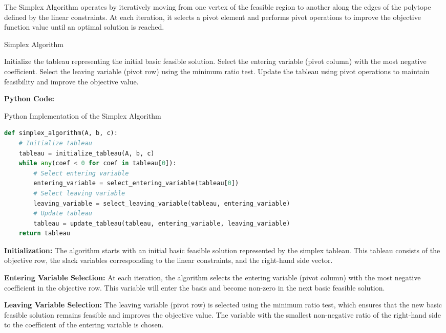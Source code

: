 \documentclass[12pt]{book} %
\begin{document}
The Simplex Algorithm operates by iteratively moving from one vertex of the feasible region to another along the edges of the polytope defined by the linear constraints. At each iteration, it selects a pivot element and performs pivot operations to improve the objective function value until an optimal solution is reached.
\FloatBarrier
\begin{algorithm}[H]
\caption{Simplex Algorithm}
\begin{algorithmic}[1]
\State Initialize the tableau representing the initial basic feasible solution.
    \State Select the entering variable (pivot column) with the most negative coefficient.
    \State Select the leaving variable (pivot row) using the minimum ratio test.
    \State Update the tableau using pivot operations to maintain feasibility and improve the objective value.
\EndWhile
\end{algorithmic}
\end{algorithm}
\FloatBarrier
\textbf{Python Code:}
\FloatBarrier
\begin{algorithm}[H]
\caption{Python Implementation of the Simplex Algorithm}
\begin{lstlisting}[language=Python]
def simplex_algorithm(A, b, c):
    # Initialize tableau
    tableau = initialize_tableau(A, b, c)
    while any(coef < 0 for coef in tableau[0]):
        # Select entering variable
        entering_variable = select_entering_variable(tableau[0])
        # Select leaving variable
        leaving_variable = select_leaving_variable(tableau, entering_variable)
        # Update tableau
        tableau = update_tableau(tableau, entering_variable, leaving_variable)
    return tableau
\end{lstlisting}
\end{algorithm}
\FloatBarrier
\textbf{Initialization:} The algorithm starts with an initial basic feasible solution represented by the simplex tableau. This tableau consists of the objective row, the slack variables corresponding to the linear constraints, and the right-hand side vector.

\textbf{Entering Variable Selection:} At each iteration, the algorithm selects the entering variable (pivot column) with the most negative coefficient in the objective row. This variable will enter the basis and become non-zero in the next basic feasible solution.

\textbf{Leaving Variable Selection:} The leaving variable (pivot row) is selected using the minimum ratio test, which ensures that the new basic feasible solution remains feasible and improves the objective value. The variable with the smallest non-negative ratio of the right-hand side to the coefficient of the entering variable is chosen.
\end{document}
